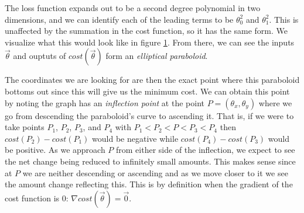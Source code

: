 \begin{figure}[t!]
    \centering
    \caption{}
    \label{fg:cost}
\end{figure}

The loss function expands out to be a second degree polynomial in two
dimensions, and we can identify each of the leading terms to be $\theta_0^2$ and
$\theta_1^2$. This is unaffected by the summation in the cost function, so it
has the same form. We visualize what this would look like in figure
\ref{fg:cost}. From there, we can see the inputs $\vec\theta$ and ouptuts of
$cost(\vec\theta)$ form an \emph{elliptical paraboloid}.

The coordinates we are looking for are then the exact point where this
paraboloid bottoms out since this will give us the minimum cost. We can obtain
this point by noting the graph has an \emph{inflection point} at the point $P =
(\theta_x, \theta_y)$ where we go from descending the paraboloid's curve to
ascending it. That is, if we were to take points $P_1$, $P_2$, $P_3$, and $P_4$
with $P_1 < P_2 < P < P_3 < P_4$ then $cost(P_2) - cost(P_1)$ would be negative
while $cost(P_4) - cost(P_3)$ would be positive. As we approach $P$ from either
side of the inflection, we expect to see the net change being
reduced to infinitely small amounts. This makes sense since at
$P$ we are neither descending or ascending and as we move closer to it we see
the amount change reflecting this. This is by definition when the gradient of
the cost function is 0: $\nabla cost(\vec\theta) = \vec{0}$.

